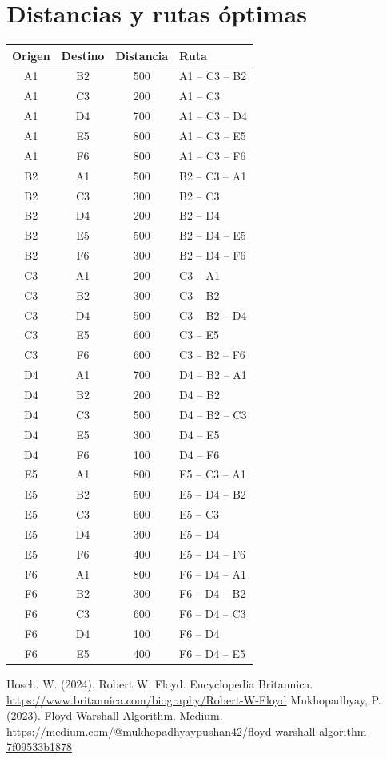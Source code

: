 \documentclass[a4paper,11pt]{article}
\begin{document}
\section*{Distancias y rutas \'optimas}
\begin{longtable}{c c c p{7cm}}
\hline
Origen & Destino & Distancia & Ruta \\\hline
\endhead
A1 & B2 & 500 & A1 -- C3 -- B2 \\
A1 & C3 & 200 & A1 -- C3 \\
A1 & D4 & 700 & A1 -- C3 -- D4 \\
A1 & E5 & 800 & A1 -- C3 -- E5 \\
A1 & F6 & 800 & A1 -- C3 -- F6 \\
B2 & A1 & 500 & B2 -- C3 -- A1 \\
B2 & C3 & 300 & B2 -- C3 \\
B2 & D4 & 200 & B2 -- D4 \\
B2 & E5 & 500 & B2 -- D4 -- E5 \\
B2 & F6 & 300 & B2 -- D4 -- F6 \\
C3 & A1 & 200 & C3 -- A1 \\
C3 & B2 & 300 & C3 -- B2 \\
C3 & D4 & 500 & C3 -- B2 -- D4 \\
C3 & E5 & 600 & C3 -- E5 \\
C3 & F6 & 600 & C3 -- B2 -- F6 \\
D4 & A1 & 700 & D4 -- B2 -- A1 \\
D4 & B2 & 200 & D4 -- B2 \\
D4 & C3 & 500 & D4 -- B2 -- C3 \\
D4 & E5 & 300 & D4 -- E5 \\
D4 & F6 & 100 & D4 -- F6 \\
E5 & A1 & 800 & E5 -- C3 -- A1 \\
E5 & B2 & 500 & E5 -- D4 -- B2 \\
E5 & C3 & 600 & E5 -- C3 \\
E5 & D4 & 300 & E5 -- D4 \\
E5 & F6 & 400 & E5 -- D4 -- F6 \\
F6 & A1 & 800 & F6 -- D4 -- A1 \\
F6 & B2 & 300 & F6 -- D4 -- B2 \\
F6 & C3 & 600 & F6 -- D4 -- C3 \\
F6 & D4 & 100 & F6 -- D4 \\
F6 & E5 & 400 & F6 -- D4 -- E5 \\
\hline
\end{longtable}
\renewcommand{\refname}{Referencias}
\begin{thebibliography}{9}
 Hosch. W. (2024). Robert W. Floyd. Encyclopedia Britannica. \\ \url{https://www.britannica.com/biography/Robert-W-Floyd}
 Mukhopadhyay, P. (2023). Floyd-Warshall Algorithm. Medium. \\ \url{https://medium.com/@mukhopadhyaypushan42/floyd-warshall-algorithm-7f09533b1878}
\end{thebibliography}
\end{document}
